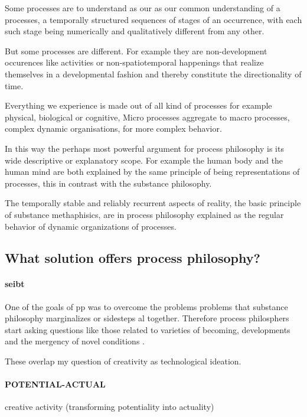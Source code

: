 Some processes are to understand as our as our common understanding of a processes, a temporally structured sequences of stages of an occurrence, with each such stage being numerically and qualitatively different from any other. 

But some processes are different. For example they are non-development occurences like activities or non-spatiotemporal happenings that realize themselves in a developmental fashion and thereby constitute the directionality of time. 

Everything we experience is made out of all kind of processes for example physical, biological or cognitive, Micro processes aggregate to macro processes, complex dynamic organisations, for more complex behavior. 

In this way the perhaps most powerful argument for process philosophy is its wide descriptive or explanatory scope. For example the human body and the human mind are both explained by the same principle of being representations of processes, this in contrast with the substance philosophy.

The temporally stable and reliably recurrent aspects of reality, the basic principle of substance methaphisics, are in process philosophy explained as the regular behavior of dynamic organizations of processes.




\subsection{What solution offers process philosophy?}
\paragraph{seibt}
One of the goals of pp was to overcome the problems problems that substance philosophy marginalizes or sidesteps al together. Therefore process philosphers start asking questions like those related to varieties of becoming, developments and the mergency of novel conditions \cite{seibt-2013-sep}.

These overlap my question of creativity as technological ideation.


\paragraph{ POTENTIAL-ACTUAL}
creative activity (transforming potentiality into actuality)

